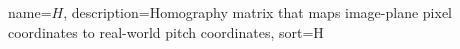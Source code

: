 
{
    name=\(H\),
    description={Homography matrix that maps image-plane pixel coordinates to real-world pitch coordinates},
    sort=H
}
